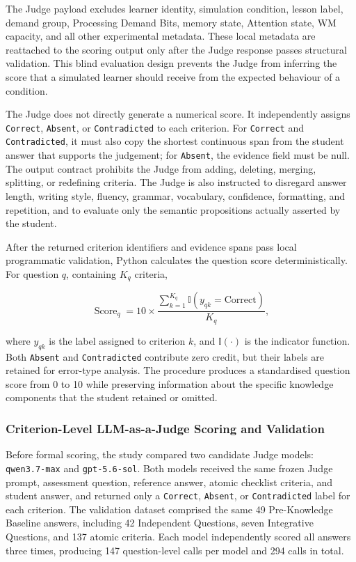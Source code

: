 The Judge payload excludes learner identity, simulation condition, lesson label, demand group, Processing Demand Bits, memory state, Attention state, WM capacity, and all other experimental metadata. These local metadata are reattached to the scoring output only after the Judge response passes structural validation. This blind evaluation design prevents the Judge from inferring the score that a simulated learner should receive from the expected behaviour of a condition.

The Judge does not directly generate a numerical score. It independently assigns \texttt{Correct}, \texttt{Absent}, or \texttt{Contradicted} to each criterion. For \texttt{Correct} and \texttt{Contradicted}, it must also copy the shortest continuous span from the student answer that supports the judgement; for \texttt{Absent}, the evidence field must be null. The output contract prohibits the Judge from adding, deleting, merging, splitting, or redefining criteria. The Judge is also instructed to disregard answer length, writing style, fluency, grammar, vocabulary, confidence, formatting, and repetition, and to evaluate only the semantic propositions actually asserted by the student.

After the returned criterion identifiers and evidence spans pass local programmatic validation, Python calculates the question score deterministically. For question \(q\), containing \(K_q\) criteria,

\[
\operatorname{Score}_q
=
10
\times
\frac{
\sum_{k=1}^{K_q}
\mathbb{I}\!\left(y_{qk}=\mathrm{Correct}\right)
}{K_q},
\]

where \(y_{qk}\) is the label assigned to criterion \(k\), and \(\mathbb{I}(\cdot)\) is the indicator function. Both \texttt{Absent} and \texttt{Contradicted} contribute zero credit, but their labels are retained for error-type analysis. The procedure produces a standardised question score from 0 to 10 while preserving information about the specific knowledge components that the student retained or omitted.

\subsubsection{Criterion-Level LLM-as-a-Judge Scoring and Validation}
\label{subsec:judge-validation}

Before formal scoring, the study compared two candidate Judge models: \texttt{qwen3.7-max} and \texttt{gpt-5.6-sol}. Both models received the same frozen Judge prompt, assessment question, reference answer, atomic checklist criteria, and student answer, and returned only a \texttt{Correct}, \texttt{Absent}, or \texttt{Contradicted} label for each criterion. The validation dataset comprised the same 49 Pre-Knowledge Baseline answers, including 42 Independent Questions, seven Integrative Questions, and 137 atomic criteria. Each model independently scored all answers three times, producing 147 question-level calls per model and 294 calls in total.

